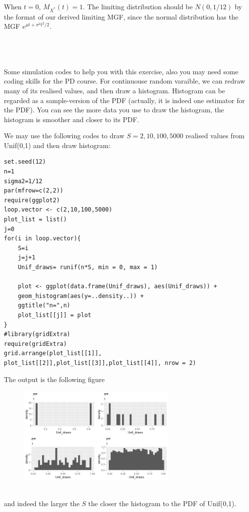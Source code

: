 \begin{exercise}
\begin{solution}
\begin{enumerate}
  When $t=0$, $M_{X^*}(t) =1$. 	
  The limiting distribution should be $N(0,1/12)$ by the format of our derived limiting MGF, since the normal distribution has the MGF $e^{\mu t + \sigma^2t^2/2 }$.	
  	\end{enumerate}
  ~\\~\\~\\
  Some simulation codes to help you with this exercise, also you may need some coding skills for the PD course.
  For continuouse random varaible, we can redraw many of its realised values, and then draw a histogram. Histogram can be regarded as a sample-version of the PDF (actually, it is indeed one estimator for the PDF). You can see the more data you use to draw the histogram, the histogram is smoother and closer to its PDF. 
  
  We may use the following codes to draw $S=2,10,100,5000$ realised values from Unif(0,1) and then draw histogram:
  \begin{verbatim}
set.seed(12)
n=1
sigma2=1/12
par(mfrow=c(2,2))
require(ggplot2)
loop.vector <- c(2,10,100,5000)
plot_list = list()
j=0
for(i in loop.vector){ 
	S=i
	j=j+1
	Unif_draws= runif(n*S, min = 0, max = 1)  
	
	plot <- ggplot(data.frame(Unif_draws), aes(Unif_draws)) + 
	geom_histogram(aes(y=..density..)) +
	ggtitle("n=",n)
	plot_list[[j]] = plot
}
#library(gridExtra)
require(gridExtra)
grid.arrange(plot_list[[1]], plot_list[[2]],plot_list[[3]],plot_list[[4]], nrow = 2)
  \end{verbatim} 
 The output is the following figure~\\
 \begin{figure}[htbp!]
 	\includegraphics[width=0.7\textwidth]{0}
 \end{figure}  		   ~\\
 and indeed the larger the $S$ the closer the histogram to the PDF of Unif(0,1).\\~\\~\\
 

\end{solution}
\end{exercise}

